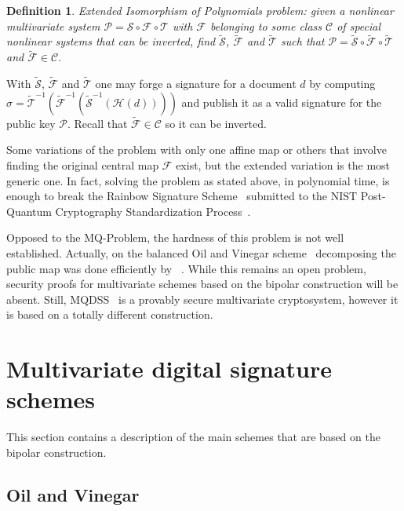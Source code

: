 \documentclass{ufsctex/ufsctex}
\newtheorem{definition}{Definition}
\begin{document}
\begin{definition}
Extended Isomorphism of Polynomials problem: given a nonlinear multivariate
system $\mathcal{P} = \mathcal{S} \circ \mathcal{F} \circ \mathcal{T}$ with
$\mathcal{F}$ belonging to some class $\mathcal{C}$ of special nonlinear
systems that can be inverted, find $\tilde{\mathcal{S}}$, $\tilde{\mathcal{F}}$
and $\tilde{\mathcal{T}}$ such that $\mathcal{P} = \tilde{\mathcal{S}} \circ
\tilde{\mathcal{F}} \circ \tilde{\mathcal{T}}$ and $\tilde{\mathcal{F}} \in
\mathcal{C}$.
\end{definition}

With $\tilde{\mathcal{S}}$, $\tilde{\mathcal{F}}$ and $\tilde{\mathcal{T}}$ one
may forge a signature for a document $d$ by computing $\sigma =
\tilde{\mathcal{T}}^{-1}(\tilde{\mathcal{F}}^{-1}(\tilde{\mathcal{S}}^{-1}(
\mathcal{H}(d))))$ and publish it as a valid signature for the public key
$\mathcal{P}$. Recall that $\tilde{\mathcal{F}} \in \mathcal{C}$ so it can be
inverted.

Some variations of the problem with only one affine map or others that
involve finding the original central map $\mathcal{F}$ exist, but the extended
variation is the most generic one. In fact, solving the problem as stated
above, in polynomial time, is enough to break the Rainbow Signature
Scheme~\cite{ding2005rainbow} submitted to the NIST Post-Quantum Cryptography
Standardization Process~\cite{ding2017nist}.

Opposed to the MQ-Problem, the hardness of this problem is not well
established. Actually, on the balanced Oil and Vinegar
scheme~\cite{patarin1997ov} decomposing the public map was done efficiently by
~\cite{kipnis1998cryptanalysis}. While this remains an open problem, security
proofs for multivariate schemes based on the bipolar construction will be
absent. Still, MQDSS~\cite{chen20165} is a provably secure multivariate cryptosystem,
however it is based on a totally different construction.

\section{Multivariate digital signature schemes}\label{sec:mqschemes}

This section contains a description of the main schemes that are based on the
bipolar construction.

\subsection{Oil and Vinegar}\label{sec:ov}
\end{document}
